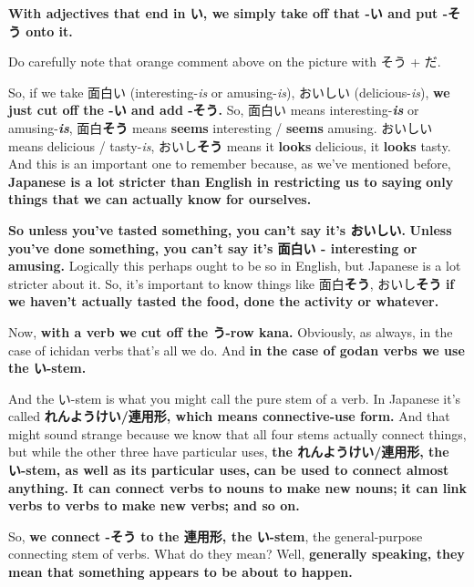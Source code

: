{\bf With adjectives that end in い, we simply take off that -い and put -そう onto it.}

{}

Do carefully note that orange comment above on the picture with そう + だ.

So, if we take 面白い (interesting-{\em is} or amusing-{\em is}), おいしい (delicious-{\em is}), {\bf we just cut off the -い and add -そう.} So, 面白い means interesting-{\bf {\em is}} or amusing-{\bf {\em is}}, 面白{\bf そう} means {\bf seems} interesting / {\bf seems} amusing. おいしい means delicious / tasty-{\em is}, おいし{\bf そう} means it {\bf looks} delicious, it {\bf looks} tasty. And this is an important one to remember because, as we've mentioned before, {\bf Japanese is a lot stricter than English in restricting us to saying} {\bf only things that we can actually know for ourselves.}

\thinrule

{\bf So unless you've tasted something, you can't say it's おいしい.} {\bf Unless you've done something, you can't say it's 面白い - interesting or amusing.} Logically this perhaps ought to be so in English, but Japanese is a lot stricter about it. So, it's important to know things like 面白{\bf そう}, おいし{\bf そう} {\bf if we haven't actually tasted the food, done the activity or whatever.}

\stopsectionlevel

\startsectionlevel[title={With verbs},reference={with-verbs}]

Now, {\bf with a verb we cut off the う-row kana.} Obviously, as always, in the case of ichidan verbs that's all we do. And {\bf in the case of godan verbs we use the い-stem.}

{}

And the い-stem is what you might call the pure stem of a verb. In Japanese it's called {\bf れんようけい/連用形, which means connective-use form.} And that might sound strange because we know that all four stems actually connect things, but while the other three have particular uses, {\bf the れんようけい/連用形, the い-stem, as well as its particular uses,} {\bf can be used to connect almost anything.} {\bf It can connect verbs to nouns to make new nouns;} {\bf it can link verbs to verbs to make new verbs; and so on.}

\thinrule

So, {\bf we connect -そう to the 連用形, the い-stem}, the general-purpose connecting stem of verbs. What do they mean? Well, {\bf generally speaking, they mean that something appears to be about to happen.}

